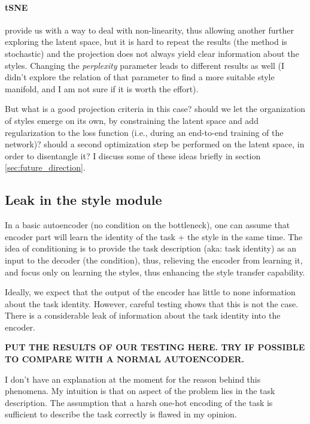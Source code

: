 \paragraph{tSNE} provide us with a way to deal with non-linearity, thus allowing another further exploring the latent space, but it is hard to repeat the results (the method is stochastic) and the projection does not always yield clear information about the styles. Changing the \textit{perplexity} parameter leads to different results as well (I didn't explore the relation of that parameter to find a more suitable style manifold, and I am not sure if it is worth the effort).

But what is a good projection criteria in this case? should we let the organization of styles emerge on its own, by constraining the latent space and add regularization to the loss function (i.e., during an end-to-end training of the network)? should a second optimization step be performed on the latent space, in order to disentangle it? I discuss some of these ideas briefly in section \ref{sec:future_direction}.

\subsection{Leak in the style module}
In a basic autoencoder (no condition on the bottleneck), one can assume that encoder part will learn the identity of the task + the style in the same time. The idea of conditioning is to provide the task description (aka: task identity) as an input to the decoder (the condition), thus, relieving the encoder from learning it, and focus only on learning the styles, thus enhancing the style transfer capability.

Ideally, we expect that the output of the encoder has little to none information about the task identity. However, careful testing shows that this is not the case. There is a considerable leak of information about the task identity into the encoder.

\textbf{PUT THE RESULTS OF OUR TESTING HERE. TRY IF POSSIBLE TO COMPARE WITH A NORMAL AUTOENCODER.}

I don't have an explanation at the moment for the reason behind this phenomena. My intuition is that on aspect of the problem lies in the task description. The assumption that a harsh one-hot encoding of the task is sufficient to describe the task correctly is flawed in my opinion.

